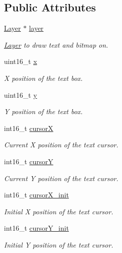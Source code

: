 \subsection*{Public Attributes}
\begin{DoxyCompactItemize}
\item 
\mbox{\hyperlink{struct_layer}{Layer}} $\ast$ \mbox{\hyperlink{group__textbox_ga6e30e306c0894a9cd95ffe51fa878c5f}{layer}}
\begin{DoxyCompactList}\small\item\em \mbox{\hyperlink{struct_layer}{Layer}} to draw text and bitmap on. \end{DoxyCompactList}\item 
uint16\+\_\+t \mbox{\hyperlink{group__textbox_ga61e7ab17d9106687e4cc5deb7b801c4f}{x}}
\begin{DoxyCompactList}\small\item\em X position of the text box. \end{DoxyCompactList}\item 
uint16\+\_\+t \mbox{\hyperlink{group__textbox_ga7de1ea2ec650f3160a7fcbf21f5fe606}{y}}
\begin{DoxyCompactList}\small\item\em Y position of the text box. \end{DoxyCompactList}\item 
int16\+\_\+t \mbox{\hyperlink{group__textbox_gab8a4ab22fd92b094d7e20da5dd4c6ecb}{cursorX}}
\begin{DoxyCompactList}\small\item\em Current X position of the text cursor. \end{DoxyCompactList}\item 
int16\+\_\+t \mbox{\hyperlink{group__textbox_ga486d45b3fcf48020cc4fef908d1a32ec}{cursorY}}
\begin{DoxyCompactList}\small\item\em Current Y position of the text cursor. \end{DoxyCompactList}\item 
int16\+\_\+t \mbox{\hyperlink{group__textbox_gaa505c0e1aa35305c1af3b71a5b761393}{cursor\+X\+\_\+init}}
\begin{DoxyCompactList}\small\item\em Initial X position of the text cursor. \end{DoxyCompactList}\item 
int16\+\_\+t \mbox{\hyperlink{group__textbox_ga9dc197044dc20a082831cc2f5aea2661}{cursor\+Y\+\_\+init}}
\begin{DoxyCompactList}\small\item\em Initial Y position of the text cursor. \end{DoxyCompactList}\item 

\end{DoxyCompactItemize}
